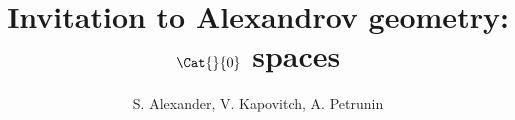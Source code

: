 \documentclass[twoside]{book}
\begin{document}
\frontmatter
\title{Invitation to Alexandrov geometry: $\Cat{}{0}$ spaces}
\author{S. Alexander, V. Kapovitch, A. Petrunin}
\date{}
\maketitle
\thispagestyle{empty}
\newpage
\tableofcontents







{\small

}

\end{document}
